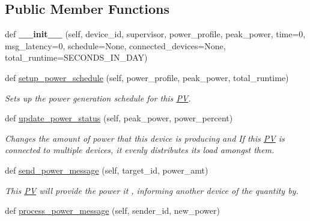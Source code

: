 \subsection*{Public Member Functions}
\begin{DoxyCompactItemize}
\item 
\mbox{\label{class_build_1_1_objects_1_1pv_1_1_p_v_ab85f5c9b0dbc579445834b47f344e9d7}} 
def {\bfseries \+\_\+\+\_\+init\+\_\+\+\_\+} (self, device\+\_\+id, supervisor, power\+\_\+profile, peak\+\_\+power, time=0, msg\+\_\+latency=0, schedule=None, connected\+\_\+devices=None, total\+\_\+runtime=S\+E\+C\+O\+N\+D\+S\+\_\+\+I\+N\+\_\+\+D\+AY)
\item 
def \hyperlink{class_build_1_1_objects_1_1pv_1_1_p_v_a8c06b93d9d13ee9b6991c3b498bf469e}{setup\+\_\+power\+\_\+schedule} (self, power\+\_\+profile, peak\+\_\+power, total\+\_\+runtime)
\begin{DoxyCompactList}\small\item\em Sets up the power generation schedule for this \hyperlink{class_build_1_1_objects_1_1pv_1_1_p_v}{PV}. \end{DoxyCompactList}\item 
def \hyperlink{class_build_1_1_objects_1_1pv_1_1_p_v_a0c27298b51f1e227cee28bb3f6528742}{update\+\_\+power\+\_\+status} (self, peak\+\_\+power, power\+\_\+percent)
\begin{DoxyCompactList}\small\item\em Changes the amount of power that this device is producing and If this \hyperlink{class_build_1_1_objects_1_1pv_1_1_p_v}{PV} is connected to multiple devices, it evenly distributes its load amongst them. \end{DoxyCompactList}\item 
\mbox{\label{class_build_1_1_objects_1_1pv_1_1_p_v_acbeb8820230c1c317e553db544b38286}} 
def \hyperlink{class_build_1_1_objects_1_1pv_1_1_p_v_acbeb8820230c1c317e553db544b38286}{send\+\_\+power\+\_\+message} (self, target\+\_\+id, power\+\_\+amt)
\begin{DoxyCompactList}\small\item\em This \hyperlink{class_build_1_1_objects_1_1pv_1_1_p_v}{PV} will provide the power it , informing another device of the quantity by. \end{DoxyCompactList}\item 
def \hyperlink{class_build_1_1_objects_1_1pv_1_1_p_v_a4e7810d5ba27d6414abca31af54d8949}{process\+\_\+power\+\_\+message} (self, sender\+\_\+id, new\+\_\+power)

\end{DoxyCompactItemize}
